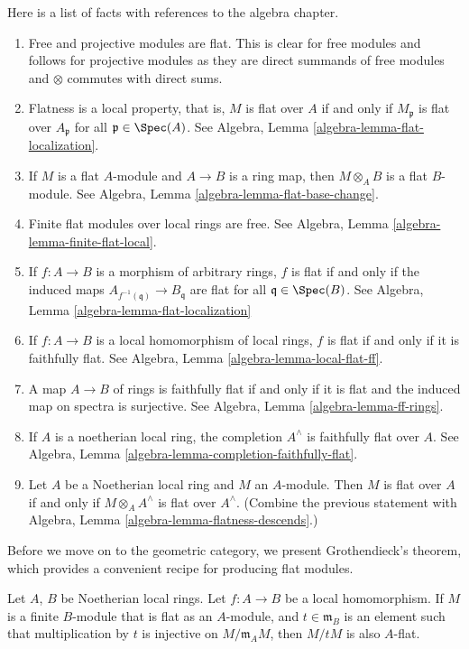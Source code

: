 \noindent
Here is a list of facts with references to the algebra chapter.
\begin{enumerate}
\item Free and projective modules are flat. This is clear for free modules
and follows for projective modules as they are direct summands of free
modules and $\otimes$ commutes with direct sums.
\item Flatness is a local property, that is, $M$ is flat over $A$
if and only if $M_{\mathfrak p}$ is flat over $A_{\mathfrak p}$ for all
$\mathfrak p \in \Spec(A)$.
See Algebra, Lemma \ref{algebra-lemma-flat-localization}.
\item If $M$ is a flat $A$-module and $A \to B$ is a ring map,
then $M \otimes_A B$ is a flat $B$-module. See
Algebra, Lemma \ref{algebra-lemma-flat-base-change}.
\item Finite flat modules over local rings are free.
See Algebra, Lemma \ref{algebra-lemma-finite-flat-local}.
\item If $f : A \to B$ is a morphism of arbitrary rings,
$f$ is flat if and only if the induced maps
$A_{f^{-1}(\mathfrak q)} \to B_{\mathfrak q}$ are flat for all
$\mathfrak q \in \Spec(B)$.
See Algebra, Lemma \ref{algebra-lemma-flat-localization}
\item If $f : A \to B$ is a local homomorphism of local rings,
$f$ is flat if and only if it is faithfully flat.
See Algebra, Lemma \ref{algebra-lemma-local-flat-ff}.
\item A map $A \to B$ of rings is faithfully flat if and only if it is
flat and the induced map on spectra is surjective.
See Algebra, Lemma \ref{algebra-lemma-ff-rings}.
\item If $A$ is a noetherian local ring, the completion
$A^\wedge$ is faithfully flat over $A$.
See Algebra, Lemma \ref{algebra-lemma-completion-faithfully-flat}.
\item Let $A$ be a Noetherian local ring and $M$ an $A$-module.
Then $M$ is flat over $A$ if and only if $M \otimes_A A^\wedge$
is flat over $A^\wedge$. (Combine the previous statement with
Algebra, Lemma \ref{algebra-lemma-flatness-descends}.)
\end{enumerate}
Before we move on to the geometric category, we present Grothendieck's
theorem, which provides a convenient recipe for producing flat
modules.

\begin{theorem}
\label{theorem-flatness-grothendieck}
Let $A$, $B$ be Noetherian local rings.
Let $f : A \to B$ be a local homomorphism.
If $M$ is a finite $B$-module that is flat as an $A$-module,
and $t \in \mathfrak m_B$ is an element such that multiplication
by $t$ is injective on $M/\mathfrak m_AM$, then $M/tM$ is also $A$-flat.
\end{theorem}

